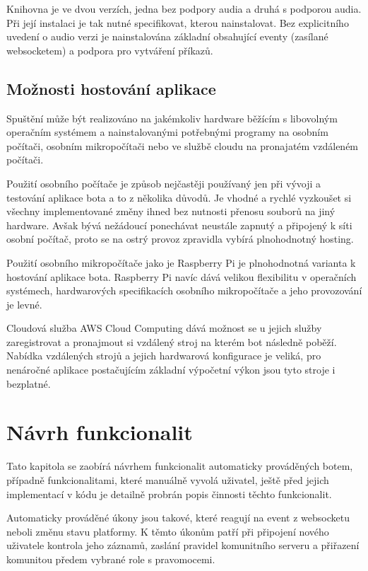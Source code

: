 \documentclass[
  program=inf,
biblatex=false,
sourcecodes=true,
joinlists=true,
  figures=true,
  tables=true,
  glossaries=true,
  index=false
]{kidiplom}
\begin{document}
Knihovna je ve dvou verzích, jedna bez podpory audia a druhá s podporou audia. Při její instalaci
je tak nutné specifikovat, kterou nainstalovat. Bez explicitního uvedení o audio verzi je nainstalována základní 
obsahující eventy (zasílané websocketem) a podpora pro vytváření příkazů.

\subsection{Možnosti hostování aplikace}
Spuštění může být realizováno na jakémkoliv hardware běžícím s libovolným operačním systémem 
a nainstalovanými potřebnými programy na osobním počítači, osobním mikropočítači 
nebo ve službě cloudu na pronajatém vzdáleném počítači.

Použití osobního počítače je způsob nejčastěji používaný jen při vývoji a testování aplikace bota 
a to z několika důvodů. Je vhodné a rychlé vyzkoušet si všechny implementované změny
ihned bez nutnosti přenosu souborů na jiný hardware. Avšak bývá nežádoucí ponechávat
neustále zapnutý a připojený k síti osobní počítač, proto se na ostrý provoz zpravidla vybírá
plnohodnotný hosting.

Použití osobního mikropočítače jako je Raspberry Pi \cite{rpi} je plnohodnotná varianta k 
hostování aplikace bota. Raspberry Pi navíc dává velikou flexibilitu v operačních
systémech, hardwarových specifikacích osobního mikropočítače a jeho provozování
je levné.

Cloudová služba AWS Cloud Computing \cite{aws} dává možnost se u jejich služby zaregistrovat
a pronajmout si vzdálený stroj na kterém bot následně poběží. Nabídka vzdálených
strojů a jejich hardwarová konfigurace je veliká, pro nenáročné aplikace postačujícím
základní výpočetní výkon jsou tyto stroje i bezplatné.

\section{Návrh funkcionalit}
Tato kapitola se zaobírá návrhem funkcionalit automaticky prováděných botem, případně
funkcionalitami, které manuálně vyvolá uživatel, ještě před jejich implementací v kódu
je detailně probrán popis činnosti těchto funkcionalit.

Automaticky prováděné úkony jsou takové, které reagují na event z websocketu neboli změnu stavu
platformy. K těmto úkonům patří při připojení nového uživatele
kontrola jeho záznamů, zaslání pravidel komunitního serveru a přiřazení komunitou předem 
vybrané role s pravomocemi.
\end{document}
